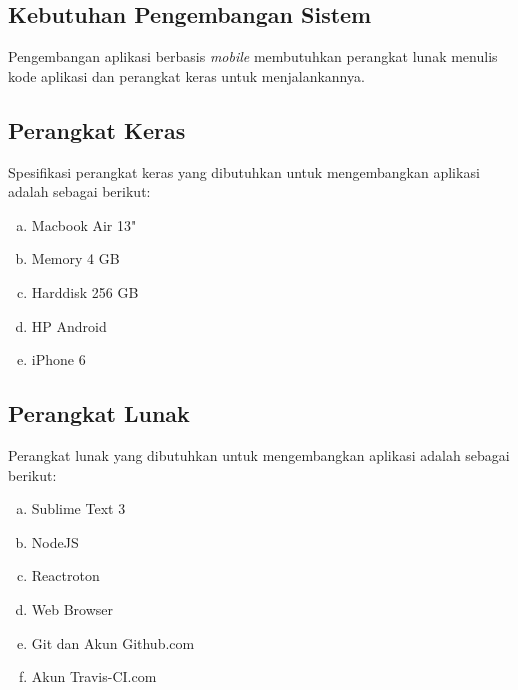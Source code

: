 \begin{spacing}{2}
\section{Kebutuhan Pengembangan Sistem}
	Pengembangan aplikasi berbasis \emph{mobile} membutuhkan perangkat lunak menulis kode aplikasi dan perangkat keras untuk menjalankannya.

	\subsection{Perangkat Keras}
		Spesifikasi perangkat keras yang dibutuhkan untuk mengembangkan aplikasi adalah sebagai berikut:

		\vspace{-0.5cm}

		\begin{enumerate}[a.]
		\itemsep0em
			\item Macbook Air 13"
			\item Memory 4 GB
			\item Harddisk 256 GB
			\item HP Android
			\item iPhone 6
		\end{enumerate}

	\subsection{Perangkat Lunak}
		Perangkat lunak yang dibutuhkan untuk mengembangkan aplikasi adalah sebagai berikut:

		\vspace{-0.5cm}

		\begin{enumerate}[a.]
		\itemsep0em
			\item Sublime Text 3
			\item NodeJS
			\item Reactroton
			\item Web Browser
			\item Git dan Akun Github.com
			\item Akun Travis-CI.com
		\end{enumerate}


\end{spacing}
